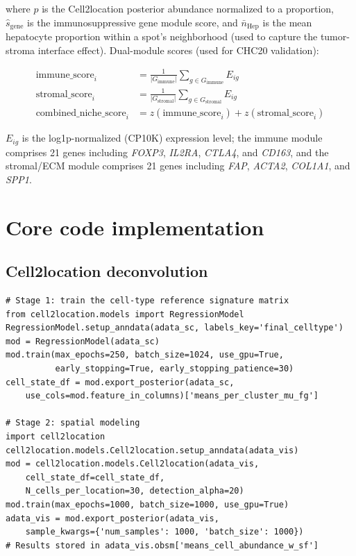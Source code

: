 \documentclass[12pt, a4paper]{article}
\begin{document}
where $\hat{p}$ is the Cell2location posterior abundance normalized to a proportion, $\hat{s}_{\text{gene}}$ is the immunosuppressive gene module score, and $\bar{n}_{\text{Hep}}$ is the mean hepatocyte proportion within a spot's neighborhood (used to capture the tumor-stroma interface effect). Dual-module scores (used for CHC20 validation):

\begin{align}
\text{immune\_score}_i &= \frac{1}{|G_{\text{immune}}|}\sum_{g \in G_{\text{immune}}} E_{ig} \\
\text{stromal\_score}_i &= \frac{1}{|G_{\text{stromal}}|}\sum_{g \in G_{\text{stromal}}} E_{ig} \\
\text{combined\_niche\_score}_i &= z(\text{immune\_score}_i) + z(\text{stromal\_score}_i)
\end{align}

$E_{ig}$ is the log1p-normalized (CP10K) expression level; the immune module comprises 21 genes including \textit{FOXP3}, \textit{IL2RA}, \textit{CTLA4}, and \textit{CD163}, and the stromal/ECM module comprises 21 genes including \textit{FAP}, \textit{ACTA2}, \textit{COL1A1}, and \textit{SPP1}.

\section{Core code implementation}
\label{app:code}

\subsection{Cell2location deconvolution}

\begin{lstlisting}[caption={Core code for RegressionModel training and spatial modeling}]
# Stage 1: train the cell-type reference signature matrix
from cell2location.models import RegressionModel
RegressionModel.setup_anndata(adata_sc, labels_key='final_celltype')
mod = RegressionModel(adata_sc)
mod.train(max_epochs=250, batch_size=1024, use_gpu=True,
          early_stopping=True, early_stopping_patience=30)
cell_state_df = mod.export_posterior(adata_sc,
    use_cols=mod.feature_in_columns)['means_per_cluster_mu_fg']

# Stage 2: spatial modeling
import cell2location
cell2location.models.Cell2location.setup_anndata(adata_vis)
mod = cell2location.models.Cell2location(adata_vis,
    cell_state_df=cell_state_df,
    N_cells_per_location=30, detection_alpha=20)
mod.train(max_epochs=1000, batch_size=1000, use_gpu=True)
adata_vis = mod.export_posterior(adata_vis,
    sample_kwargs={'num_samples': 1000, 'batch_size': 1000})
# Results stored in adata_vis.obsm['means_cell_abundance_w_sf']
\end{lstlisting}
\end{document}
